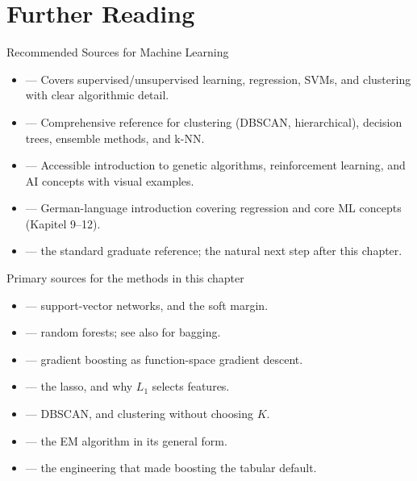 
\section{Further Reading}

\begin{v3topic}{Recommended Sources for Machine Learning}
    \begin{itemize}
        \item {} — Covers supervised/unsupervised learning, regression, SVMs, and clustering with clear algorithmic detail.
        \item {} — Comprehensive reference for clustering (DBSCAN, hierarchical), decision trees, ensemble methods, and k-NN.
        \item {} — Accessible introduction to genetic algorithms, reinforcement learning, and AI concepts with visual examples.
        \item {} — German-language introduction covering regression and core ML concepts (Kapitel 9--12).
        \item {} — the standard graduate reference; the natural next step after this chapter.
    \end{itemize}
\end{v3topic}

\begin{v3topic}{Primary sources for the methods in this chapter}
    \begin{itemize}
        \item {} — support-vector networks, and the soft margin.
        \item {} — random forests; see also  for bagging.
        \item {} — gradient boosting as function-space gradient descent.
        \item {} — the lasso, and why $L_1$ selects features.
        \item {} — DBSCAN, and clustering without choosing $K$.
        \item {} — the EM algorithm in its general form.
        \item {} — the engineering that made boosting the tabular default.
    \end{itemize}
\end{v3topic}
